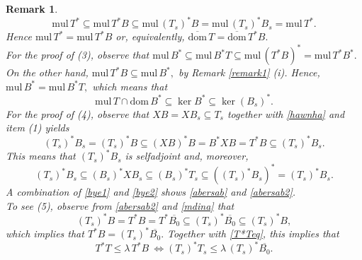 \documentclass{amsart}
\newtheorem{remark}[theorem]{Remark}
\newcommand{\ifaf}{\Leftrightarrow}
\newcommand{\mul}{\mathrm{mul} \, }
\newcommand{\dombar}{\overline{\mathrm{dom}}\,}%
\newcommand{\D}{\mathrm{dom}\,}
\newcommand{\adj}{^*}
\newcommand{\ts}{T_s}
\newcommand{\tstar}{T^{*}}
\newcommand{\inclu}{\subseteq}
\numberwithin{equation}{section}
\begin{document}
\begin{remark}
\begin{equation*}
 \mul T^* \inclu \mul T^*B\subseteq \mul (T_s)^*B = \mul (T_s)^*B_s=\mul T^*.
\end{equation*}
Hence   $\mul T^*=\mul  T^*B$ or, equivalently, $ \dombar T  = \dombar \tstar B.$\\
       \hspace*{0.4cm} For the proof of \rm (3), observe that $\mul B\adj \inclu \mul B\adj T \inclu \mul (\tstar B)\adj =  \mul \tstar B \adj.$ On the other hand,    $\mul \tstar B  \inclu \mul B\adj,$ by   Remark \ref{remark1} (i).   Hence, $ \mul B \adj = \mul B\adj T,$ which means that
       $$ \mul T \cap \D B\adj \inclu \ker B\adj \inclu \ker (B_s)\adj.
       $$
       \hspace*{0.4cm} For the proof of \rm (4), observe that   $X B = X B_s \inclu \ts$ together with \eqref{hawnha} and item (1)  yields
       \begin{equation}\label{bye1}
         (\ts)\adj B_s = (\ts)\adj B  \inclu (X B)\adj B = B\adj X B = \tstar B  \inclu (T_s)\adj B_s.
       \end{equation}
       This means that $(\ts)\adj B_s$ is selfadjoint and, moreover,
       \begin{equation}\label{bye2}
       (\ts)\adj B_s \inclu  (B_s)\adj X B_s \inclu  (B_s)\adj \ts \inclu ( (\ts)\adj B_s)\adj = (\ts)\adj B_s.
         \end{equation}
        A combination of \eqref{bye1} and \eqref{bye2} shows \eqref{abersab} and \eqref{abersab2}.\\
       \hspace*{0.4cm}  To see (5), observe from \eqref{abersab2} and \eqref{mdina} that
       $$
       (\ts)\adj B= \tstar B = \tstar \overline{B_0} \inclu (\ts)\adj \overline{B_0}  \inclu  (\ts)\adj B,
       $$
       which implies that  $\tstar B =  (\ts)\adj \overline{B_0}.$ Together with \eqref{T*Teq}, this implies that
       $$
      T^* T  \leq \lambda \, \tstar B  \ \ifaf  (\ts)\adj \ts \leq \lambda \, (\ts)\adj \overline{B_0}.
      $$
\end{remark}


\end{document}
